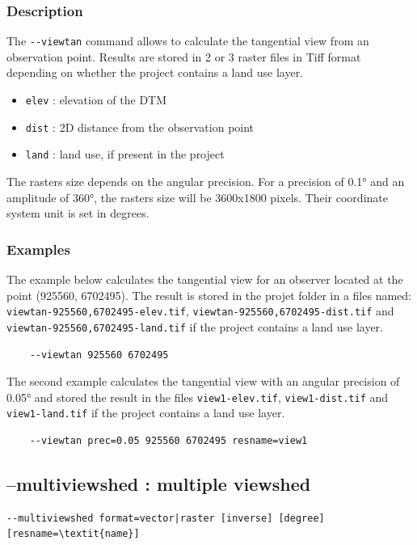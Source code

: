 \documentclass{report}
\begin{document}
\subsubsection{Description}
The \verb|--viewtan| command allows to calculate the tangential view from an observation point. Results are stored in 2 or 3 raster files in Tiff format depending on whether the project contains a land use layer.
\begin{itemize}
	\item \verb|elev| : elevation of the DTM
	\item \verb|dist| : 2D distance from the observation point
	\item \verb|land| : land use, if present in the project
\end{itemize}

The rasters size depends on the angular precision. For a precision of 0.1° and an amplitude of 360°, the rasters size will be 3600x1800 pixels. Their coordinate system unit is set in degrees.

\subsubsection{Examples}
The example below calculates the tangential view for an observer located at the point (925560, 6702495). The result is stored in the projet folder in a files named: \verb|viewtan-925560,6702495-elev.tif|, \verb|viewtan-925560,6702495-dist.tif| and \verb|viewtan-925560,6702495-land.tif| if the project contains a land use layer.
\begin{Verbatim}
	--viewtan 925560 6702495
\end{Verbatim}

The second example calculates the tangential view with an angular precision of 0.05° and stored the result in the files \verb|view1-elev.tif|, \verb|view1-dist.tif| and \verb|view1-land.tif| if the project contains a land use layer.
\begin{Verbatim}
	--viewtan prec=0.05 925560 6702495 resname=view1
\end{Verbatim}


\subsection{--multiviewshed : multiple viewshed}
\begin{Verbatim}[commandchars=\\\{\}]
--multiviewshed format=vector|raster [inverse] [degree] [resname=\textit{name}]
\end{Verbatim}
\end{document}
